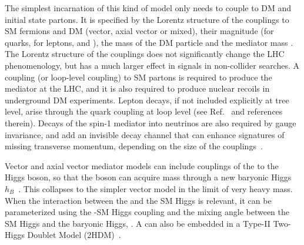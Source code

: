 The simplest incarnation of this kind of model only needs to couple to DM and initial state partons. 
It is specified by the Lorentz structure of the \Zprime
couplings to SM fermions and DM (vector, axial vector or mixed), their magnitude (\gq for quarks, \gl for leptons, and \gDM), the mass of the DM particle
\mdm and the mediator mass \mmed. The Lorentz structure of the \Zprime couplings
does not significantly change the LHC phenomenology, but has a much larger effect in signals in non-collider searches. A coupling (or loop-level coupling) to SM partons is required to produce the mediator at the LHC, and it is also required to produce nuclear recoils in underground DM experiments. Lepton decays, if not included explicitly at tree level, arise through the quark coupling at loop level (see Ref.~\cite{Albert:2017onk} and references therein). Decays of the spin-1 mediator into neutrinos are also required by gauge invariance, and add an invisible decay channel that can enhance signatures of missing transverse momentum, depending on the size of the couplings~\cite{Albert:2017onk}. 


Vector and axial vector mediator models can include couplings of the \Zprime to the Higgs boson, 
so that the \Zprime boson can acquire mass through a new baryonic Higgs $h_B$~\cite{Berlin:2014cfa}.
This collapses to the simpler vector model in the limit of very heavy \Zprime mass. 
When the interaction between the \Zprime and the SM Higgs is relevant, 
it can be parameterized using the \Zprime-SM Higgs coupling \ghZprimeZprime and the mixing angle
between the SM Higgs and the baryonic Higgs, \sinthetab. 
A \Zprime can also be embedded in a Type-II Two-Higgs Doublet Model (2HDM)~\cite{Berlin:2014cfa,Liew:2016oon}.

